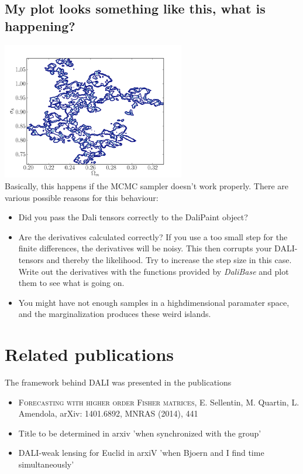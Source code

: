 \documentclass[12pt,twoside]{extarticle}
\begin{document}
\subsection{My plot looks something like this, what is happening?}
\includegraphics[width = 0.6\textwidth]{0101.pdf}\\
Basically, this happens if the MCMC sampler doesn't work properly. There are various possible reasons for this behaviour:
\begin{itemize}
 \item Did you pass the Dali tensors correctly to the DaliPaint object? 
\item Are the derivatives calculated correctly? If you use a too small step for the finite differences, the derivatives will be noisy. This then corrupts your DALI-tensors and thereby the likelihood. Try to increase the step size in this case. Write out the derivatives with the functions provided by \emph{DaliBase} and plot them to see what is going on.
\item You might have not enough samples in a highdimensional paramater space, and the marginalization produces these weird islands.
\end{itemize}




\section{Related publications}
The framework behind DALI was presented in the publications
\begin{itemize}
 \item \textsc{Forecasting with higher order Fisher matrices}, E. Sellentin, M. Quartin, L. Amendola, arXiv: 1401.6892, MNRAS (2014), 441
\item Title to be determined in arxiv 'when synchronized with the group'
\item DALI-weak lensing for Euclid in arxiV 'when Bjoern and I find time simultaneously'
\end{itemize}





 
 
 
 
\end{document}
